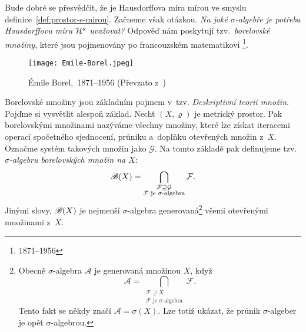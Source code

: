 Bude dobré se přesvědčit, že je Hausdorffova míra mírou ve smyslu definice~\ref{def:prostor-s-mirou}. Začneme však otázkou. \emph{Na jaké $\sigma$-algebře je potřeba Hausdorffovu míru $\mathcal{H}^{s}$ uvažovat?} Odpověď nám poskytují tzv.~\emph{borelovské množiny}, které jsou pojmenovány po francouzském matematikovi \footnote{1871--1956}.
\begin{figure}[h]
    \centering
    \texttt{[image: Emile-Borel.jpeg]}
    \caption[Émile Borel,~1871--1956]{Émile Borel,~1871--1956 (Převzato z~\cite{OConnorBorel2025})}
    \label{fig:emile-borel}
\end{figure}
Borelovské množiny jsou základním pojmem v~tzv. \emph{Deskriptivní teorii množin}. Pojďme si vysvětlit alespoň základ. Nechť $(X,\varrho)$ je metrický prostor. Pak borelovskými množinami nazýváme všechny množiny, které lze získat iteracemi operací spočetného sjednocení, průniku a~doplňku otevřených množin z~$X$. Označme systém takových množin jako $\mathcal{G}$. Na tomto základě pak definujeme tzv. \emph{$\sigma$-algebru borelovských množin na $X$}:
\[\mathscr{B}(X)=\bigcap_{\substack{\mathcal{F}\supseteq\mathcal{G}\\\text{$\mathcal{F}$ je $\sigma$-algebra}}}\mathcal{F}.\]
Jinými slovy, $\mathscr{B}(X)$ je nejmenší $\sigma$-algebra generovaná\footnote{Obecně $\sigma$-algebra $\mathcal{A}$ je generovaná množinou $X$, když
\[\mathcal{A}=\bigcap_{\substack{\mathcal{F}\supseteq X\\\text{$\mathcal{F}$ je $\sigma$-algebra}}}\mathcal{F}.\]
Tento fakt se někdy značí $\mathcal{A}=\sigma(X)$. Lze totiž ukázat, že průnik $\sigma$-algeber je opět $\sigma$-algebrou.} všemi otevřenými množinami z~$X$.

